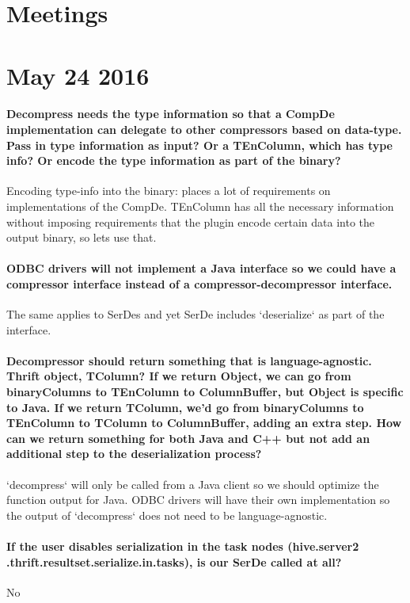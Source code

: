 \documentclass[11pt,a4paper]{article}
\begin{document}
	
\pagebreak

\section*{Meetings}

\section*{May 24 2016}
	
	\paragraph{Decompress needs the type information so that a CompDe implementation can delegate to other compressors based on data-type. Pass in type information as input? Or a TEnColumn, which has type info? Or encode the type information as part of the binary?}
	Encoding type-info into the binary: places a lot of requirements on implementations of the CompDe. TEnColumn has all the necessary information without imposing requirements that the plugin encode certain data into the output binary, so lets use that.
	
	\paragraph{ODBC drivers will not implement a Java interface so we could have a compressor interface instead of a compressor-decompressor interface.}
	The same applies to SerDes and yet SerDe includes `deserialize` as part of the interface.
	
	\paragraph{Decompressor should return something that is language-agnostic. Thrift object, TColumn? If we return Object, we can go from binaryColumns to TEnColumn to ColumnBuffer, but Object is specific to Java. If we return TColumn, we'd go from binaryColumns to TEnColumn to TColumn to ColumnBuffer, adding an extra step. How can we return something for both Java and C++ but not add an additional step to the deserialization process?}
	`decompress` will only be called from a Java client so we should optimize the function output for Java. ODBC drivers will have their own implementation so the output of `decompress` does not need to be language-agnostic.
	
	\paragraph{If the user disables serialization in the task nodes (hive.server2 .thrift.resultset.serialize.in.tasks), is our SerDe called at all?}
	No
	
\end{document}
